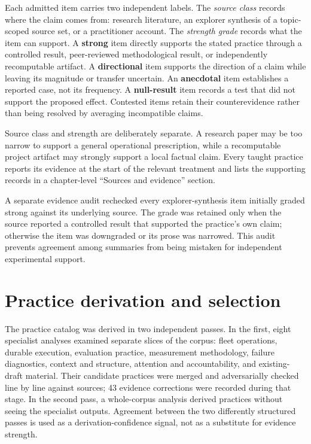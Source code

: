 Each admitted item carries two independent labels. The \emph{source class} records where the claim comes from: research literature, an explorer synthesis of a topic-scoped source set, or a practitioner account. The \emph{strength grade} records what the item can support. A \textbf{strong} item directly supports the stated practice through a controlled result, peer-reviewed methodological result, or independently recomputable artifact. A \textbf{directional} item supports the direction of a claim while leaving its magnitude or transfer uncertain. An \textbf{anecdotal} item establishes a reported case, not its frequency. A \textbf{null-result} item records a test that did not support the proposed effect. Contested items retain their counterevidence rather than being resolved by averaging incompatible claims.

Source class and strength are deliberately separate. A research paper may be too narrow to support a general operational prescription, while a recomputable project artifact may strongly support a local factual claim. Every taught practice reports its evidence at the start of the relevant treatment and lists the supporting records in a chapter-level ``Sources and evidence'' section.

A separate evidence audit rechecked every explorer-synthesis item initially graded strong against its underlying source. The grade was retained only when the source reported a controlled result that supported the practice's own claim; otherwise the item was downgraded or its prose was narrowed. This audit prevents agreement among summaries from being mistaken for independent experimental support.

\section{Practice derivation and selection}

The practice catalog was derived in two independent passes. In the first, eight specialist analyses examined separate slices of the corpus: fleet operations, durable execution, evaluation practice, measurement methodology, failure diagnostics, context and structure, attention and accountability, and existing-draft material. Their candidate practices were merged and adversarially checked line by line against sources; 43 evidence corrections were recorded during that stage. In the second pass, a whole-corpus analysis derived practices without seeing the specialist outputs. Agreement between the two differently structured passes is used as a derivation-confidence signal, not as a substitute for evidence strength.


